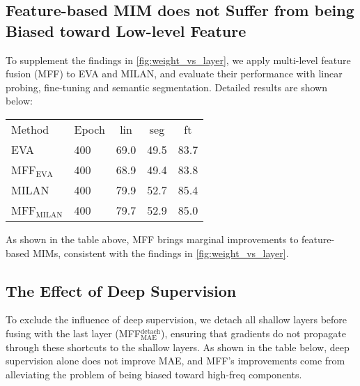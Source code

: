 \subsection{Feature-based MIM does not Suffer from being Biased toward Low-level Feature}
To supplement the findings in \autoref{fig:weight_vs_layer}, we apply multi-level feature fusion (MFF) to EVA\cite{EVA} and MILAN\cite{MILAN}, and evaluate their performance with linear probing, fine-tuning and semantic segmentation. Detailed results are shown below:

\begin{table}[h]
\centering
\tabcolsep 1.5pt
\begin{tabular}{llccc}
Method&Epoch&lin&seg&ft                               \\
\shline
EVA                & 400 & 69.0 & 49.5 & 83.7         \\
MFF$_\text{EVA}$   & 400 & 68.9  & 49.4  & 83.8       \\
MILAN                & 400 & 79.9 & 52.7 & 85.4       \\
MFF$_\text{MILAN}$   & 400 & 79.7  & 52.9  & 85.0     \\
\end{tabular}
\end{table}

\noindent As shown in the table above, MFF brings marginal improvements to feature-based MIMs, consistent with the findings in \autoref{fig:weight_vs_layer}. 

\subsection{The Effect of Deep Supervision}
To exclude the influence of deep supervision\cite{ren2023deepmim}, we detach all shallow layers before fusing with the last layer (MFF$_\text{MAE}^\text{detach}$), ensuring that gradients do not propagate through these shortcuts to the shallow layers. As shown in the table below, deep supervision alone does not improve MAE, and MFF's improvements come from alleviating the problem of being biased toward high-freq components.









 







